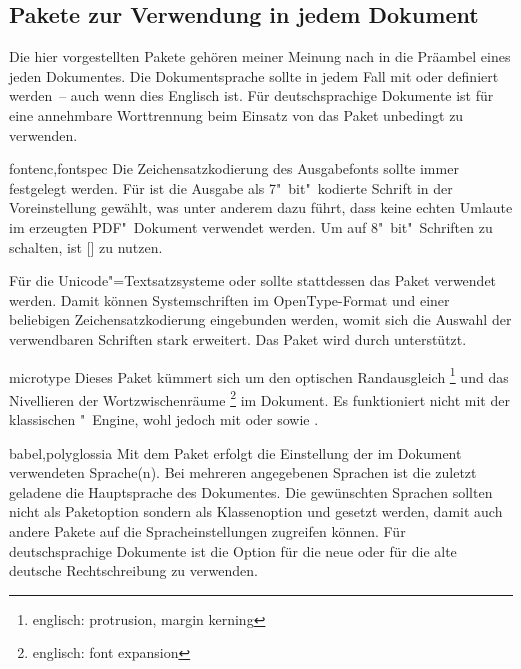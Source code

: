 \subsection{Pakete zur Verwendung in jedem Dokument}
Die hier vorgestellten Pakete gehören meiner Meinung nach in die Präambel eines 
jeden Dokumentes. Die Dokumentsprache sollte in jedem Fall mit  
oder  definiert werden~-- auch wenn dies Englisch ist. Für 
deutschsprachige Dokumente ist für eine annehmbare Worttrennung beim Einsatz 
von  das Paket  unbedingt zu verwenden.

\begin{packages}
\item[fontenc,fontspec]
  Die Zeichensatzkodierung des Ausgabefonts sollte immer festgelegt werden. Für 
   ist die Ausgabe als 7"~bit"~kodierte Schrift in der 
  Voreinstellung gewählt, was unter anderem dazu führt, dass keine echten
  Umlaute im erzeugten PDF"~Dokument verwendet werden. Um auf 8"~bit"~Schriften
  zu schalten, ist [] zu
  nutzen.
  
  Für die Unicode"=Textsatzsysteme  oder  
  sollte stattdessen das Paket  verwendet werden. Damit 
  können Systemschriften im OpenType-Format und einer beliebigen 
  Zeichensatzkodierung eingebunden werden, womit sich die Auswahl der 
  verwendbaren Schriften stark erweitert. Das Paket wird durch \TUDScript 
  unterstützt.
\item[microtype]
  Dieses Paket kümmert sich um den optischen Randausgleich%
  \footnote{englisch: protrusion, margin kerning}
  und das Nivellieren der Wortzwischenräume%
  \footnote{englisch: font expansion}
  im Dokument. Es funktioniert nicht mit der klassischen "~Engine, 
  wohl jedoch mit  oder  sowie .
\item[babel,polyglossia]
  Mit dem Paket  erfolgt die Einstellung der im Dokument 
  verwendeten Sprache(n). Bei mehreren angegebenen Sprachen ist die zuletzt 
  geladene die Hauptsprache des Dokumentes. Die gewünschten Sprachen sollten 
  nicht als Paketoption sondern als Klassenoption und gesetzt werden, damit 
  auch andere Pakete auf die Spracheinstellungen zugreifen können. Für 
  deutschsprachige Dokumente ist die Option  für die neue oder 
   für die alte deutsche Rechtschreibung zu verwenden. 
  

\end{packages}

